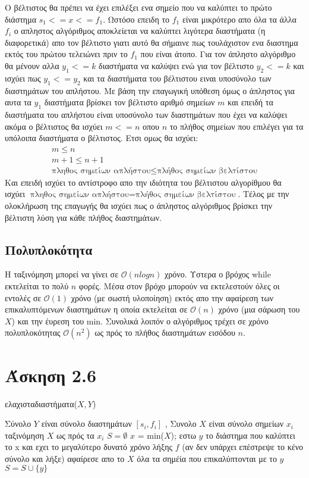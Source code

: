 \documentclass{article}
\renewcommand{\O}{\mathcal{O}}
\begin{document}
Ο βέλτιστος θα πρέπει να έχει επιλέξει ενα σημείο που να καλύπτει το πρώτο διάστημα
$ s_1 <= x <= f_1 $. Ωστόσο επειδη το $f_1$ είναι μικρότερο απο όλα τα άλλα $f_i$ ο απληστος αλγόριθμος αποκλείεται να καλύπτει λιγότερα
διαστήματα (η διαφορετικά) απο τον βέλτιστο γιατι αυτό θα σήμαινε πως τουλάχιστον ενα διαστημα εκτός του πρώτου τελειώνει πριν το $f_1$ που είναι άτοπο.
Για τον άπληστο αλγόριθμο θα μένουν αλλα $y_1 <= k$ διαστήματα να καλύψει ενώ για τον βέλτιστο $y_2 <= k$ και ισχύει πως $y_1 <= y_2$ και τα διαστήματα του βέλτιστου
ειναι υποσύνολο των διαστημάτων του απλήστου.
Με βάση την επαγωγική υπόθεση όμως ο άπληστος για αυτα τα $y_1$ διαστήματα βρίσκει τον βέλτιστο αριθμό σημείων $m$ και επειδή τα διαστήματα
του απλήστου είναι υποσύνολο των διαστημάτων που έχει να καλύψει ακόμα ο βέλτιστος θα ισχύει $m <= n$ οπου $n$ το πλήθος σημείων που επιλέγει για τα
υπόλοιπα διαστήματα ο βέλτιστος. Ετσι ομως θα ισχύει:
	\begin{eqnarray}
	m \leq n \\
	 m +1 \leq n +1 \\
	\text{πληθος σημείων απλήστου} \leq \text{πλήθος σημείων βελτίστου}
	\end{eqnarray}
Και επειδή ισχύει το αντίστροφο απο την ιδιότητα του βέλτιστου αλγορίθμου θα ισχύει $ \text{πληθος σημείων απλήστου} = \text{πλήθος σημείων βελτίστου}$.
Τέλος με την ολοκλήρωση της επαγωγής θα ισχύει πως ο άπληστος αλγόριθμος βρίσκει την βέλτιστη λύση για κάθε πλήθος διαστημάτων.
\subsection{Πολυπλοκότητα}
Η ταξινόμηση μπορεί να γίνει σε $\O(nlogn)$ χρόνο. Υστερα ο βρόχος while εκτελείται το πολύ
$n$ φορές. Μέσα στον βρόχο μπορούν να εκτελεστούν όλες οι εντολές σε $\O(1)$ χρόνο (με σωστή υλοποίηση) εκτός απο την αφαίρεση των επικαλυπτόμενων διαστημάτων η οποία εκτελείται σε $\O(n)$
χρόνο (μια σάρωση του $X$) και την έυρεση του min. Συνολικά λοιπόν ο αλγόριθμος τρέχει σε χρόνο πολυπλοκότητας $\O(n^2)$ ως πρός το πλήθος διαστημάτων εισόδου $n$. 

\section{Άσκηση 2.6}
\begin{algorithm}\caption{ελαχισταδιαστήματα($X,Y$)}\label{partition1}
  \begin{algorithmic}[1]
  \REQUIRE Σύνολο $Y$ είναι σύνολο διαστημάτων $[s_i,f_i]$ , Συνολο $X$ είναι σύνολο σημείων $x_i$ 
  \STATE ταξινόμηση $X$ ως πρός τα $x_i$
  \STATE $ S = \emptyset$
  	\STATE $ x $ = min($X$); 
  	\STATE εστω $y$ το διάστημα που καλύπτει το x και εχει το μεγαλύτερο δυνατό χρόνο λήξης $f$
  	(αν δεν υπάρχει επέστρεψε το κένο σύνολο και λήξε)	
  	\STATE αφαίρεσε απο το $X$ όλα τα σημέία που επικαλύπτονται με το $y$
  	\STATE $S = S \cup \{y\}$ 
   \ENDWHILE 
  \end{algorithmic}
\end{algorithm}  
  
\end{document}
